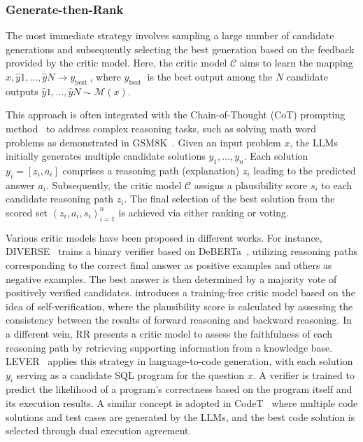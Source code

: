 \documentclass[12pt]{extarticle}
\begin{document}
\subsubsection{Generate-then-Rank}
The most immediate strategy involves sampling a large number of candidate generations and subsequently selecting the best generation based on the feedback provided by the critic model. Here, the critic model $\mathcal{C}$ aims to learn the mapping $x, \hat{y}{1}, \ldots, \hat{y}{N} \rightarrow y_{\text {best }}$, where $y_{\text {best }}$ is the best output among the $N$ candidate outputs $\hat{y}{1}, \ldots, \hat{y}{N} \sim \mathcal{M}(x)$.

This approach is often integrated with the Chain-of-Thought (CoT) prompting method~\cite{wei2023chainofthought} to address complex reasoning tasks, such as solving math word problems as demonstrated in GSM8K~\cite{cobbe2021training}. Given an input problem $x$, the LLMs initially generates multiple candidate solutions $y_{1}, \ldots, y_{n}$. Each solution $y_{i}=\left[z_{i}, a_{i}\right]$ comprises a reasoning path (explanation) $z_{i}$ leading to the predicted answer $a_{i}$. Subsequently, the critic model $\mathcal{C}$ assigns a plausibility score $s_{i}$ to each candidate reasoning path $z_{i}$. The final selection of the best solution from the scored set $\left(z_{i}, a_{i}, s_{i}\right)_{i=1}^{n}$ is achieved via either ranking or voting.

Various critic models have been proposed in different works. For instance, DIVERSE~\cite{li-etal-2023-making} trains a binary verifier based on DeBERTa~\cite{he2021deberta}, utilizing reasoning paths corresponding to the correct final answer as positive examples and others as negative examples. The best answer is then determined by a majority vote of positively verified candidates.\cite{weng2023large} introduces a training-free critic model based on the idea of self-verification, where the plausibility score is calculated by assessing the consistency between the results of forward reasoning and backward reasoning. In a different vein, RR\cite{he2022rethinking} presents a critic model to assess the faithfulness of each reasoning path by retrieving supporting information from a knowledge base. LEVER~\cite{ni2023lever} applies this strategy in language-to-code generation, with each solution $y_{i}$ serving as a candidate SQL program for the question $x$. A verifier is trained to predict the likelihood of a program's correctness based on the program itself and its execution results. A similar concept is adopted in CodeT~\cite{chen2022codet} where multiple code solutions and test cases are generated by the LLMs, and the best code solution is selected through dual execution agreement.
\end{document}
